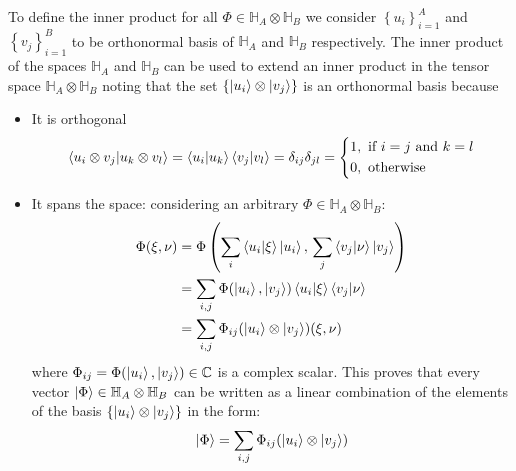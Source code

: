 To define the inner product for all $\Phi \in \mathbb{H}_A \otimes \mathbb{H}_B$ we consider $\left\lbrace u_i\right\rbrace_{i=1}^A $ and $\left\lbrace v_j \right\rbrace_{i=1}^B$ to be orthonormal basis of $\mathbb{H}_A$ and $\mathbb{H}_B$ respectively. The inner product of the spaces $\mathbb{H}_A$ and $\mathbb{H}_B$ can be used to extend an inner product in the tensor space $\mathbb{H}_A \otimes \mathbb{H}_B$ noting that the set $\left \lbrace \ket{u_i} \otimes \ket{v_j}\right \rbrace$ is an orthonormal basis because 
\begin{itemize}
    \item It is orthogonal
    $$\braket{u_i \otimes v_j | u_k \otimes v_l} = \braket{u_i | u_k} \braket{v_j |v_l} = \delta_{ij}\delta_{jl} = \left \{
    \begin{aligned}
      1 &,\ \text{if} \ i=j \text{ and } k=l\\
      0 &,\ \text{otherwise} \\
    \end{aligned}
    \right .$$

    \item It spans the space: considering an arbitrary $\Phi \in \mathbb{H}_A \otimes \mathbb{H}_B$:
    \begin{align}
        \Phi(\xi, \nu) &= \Phi\left(\sum_i \braket{u_i | \xi} \ket{u_i},\, \sum_j \braket{v_j | \nu} \ket{v_j}\right) \\
        &= \sum_{i,j} \Phi(\ket{u_i}, \ket{v_j}) \braket{u_i | \xi} \braket{v_j | \nu} \\
        &= \sum_{i,j} \Phi_{ij} (\ket{u_i} \otimes \ket{v_j}) (\xi, \nu)
    \end{align}
    where $\Phi_{ij} =  \Phi(\ket{u_i}, \ket{v_j}) \in \mathbb{C}$ is a complex scalar. This proves that every vector $\ket{\Phi} \in \mathbb{H}_A \otimes \mathbb{H}_B$ can be written as a linear combination of the elements of the basis $\left \lbrace \ket{u_i} \otimes \ket{v_j}\right \rbrace$ in the form:
    $$\ket{\Phi} = \sum_{i,j}\Phi_{ij} (\ket{u_i} \otimes \ket{v_j})$$
\end{itemize}

